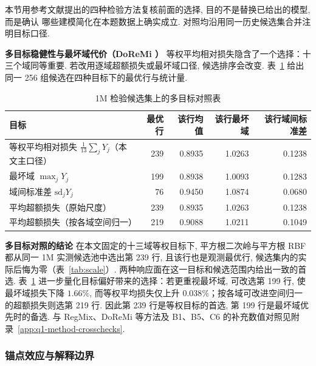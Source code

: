 本节用参考文献提出的四种检验方法复核前面的选择, 目的不是替换已给出的模型, 而是确认
哪些建模简化在本题数据上确实成立. 对照均沿用同一历史候选集合并注明目标口径. 

\textbf{多目标稳健性与最坏域代价（DoReMi \cite{doremi}）}
等权平均相对损失隐含了一个选择：十三个域同等重要. 若改用逐域超额损失或最坏域口径, 
候选排序会改变. 表~\ref{tab:q1-utility} 给出同一 256 组候选在四种目标下的最优行与统计量. 

\begin{table}[H]\centering\small
\setlength{\tabcolsep}{4pt}
\caption{1M 检验候选集上的多目标对照表}
\label{tab:q1-utility}
\begin{tabular}{lrrrr}
\toprule
目标 & 最优行 & 该行均值 & 该行最坏域 & 该行域间标准差\\
\midrule
等权平均相对损失 $\frac1{13}\sum_jY_j$（本文主口径） & 239 & 0.8935 & 1.0263 & 0.1238\\
最坏域 $\max_jY_j$ & 199 & 0.8938 & 1.0093 & 0.1283\\
域间标准差 $\mathrm{sd}_jY_j$ & 76 & 0.9450 & 1.0874 & 0.0680\\
平均超额损失（原始尺度） & 239 & 0.8935 & 1.0263 & 0.1238\\
平均超额损失（按各域空间归一） & 219 & 0.9088 & 1.0211 & 0.1049\\
\bottomrule
\end{tabular}
\end{table}

\textbf{多目标对照的结论}
在本文固定的十三域等权目标下, 平方根二次岭与平方根 RBF 都从同一 1M 实测候选池中选出第 239 行, 且该行也是观测最优行, 候选集内的实际后悔为零（表~\ref{tab:scale}）. 两种响应面在这一目标和候选范围内给出一致的首选. 表~\ref{tab:q1-utility} 进一步量化目标偏好带来的选择：若更重视最坏域, 可改选第 199 行, 使最坏域损失下降 $1.66\%$, 而等权平均损失仅上升 $0.038\%$；按各域可改进空间归一的超额损失则选第 219 行. 因此第 239 行是等权目标的首选, 第 199 行是最坏域优先时的备选. 与 RegMix、DoReMi 等方法及 B1、B5、C6 的补充数值对照见附录~\ref{app:q1-method-crosschecks}. 

\subsubsection{锚点效应与解释边界}

